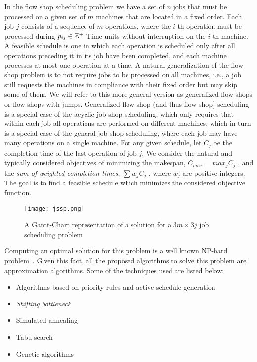 \begin{definition}
In the flow shop scheduling problem we have a set of $n$ jobs that must be
processed on a given set of $m$ machines that are located in a fixed order. Each
job $j$ consists of a sequence of $m$ operations, where the $i$-th operation
must be processed during $p_{ij} \in \mathbb{Z}^{+}$ Time units without interruption on
the $i$-th machine. A feasible schedule is one in which each operation is
scheduled only after all operations preceding it in its job have been completed,
and each machine processes at most one operation at a time. A natural
generalization of the flow shop problem is to not require jobs to be processed
on all machines, i.e., a job still requests the machines in compliance with
their fixed order but may skip some of them. We will refer to this more general
version as generalized flow shops or flow shops with jumps. Generalized flow
shop (and thus flow shop) scheduling is a special case of the acyclic job shop
scheduling, which only requires that within each job all operations are
performed on different machines, which in turn is a special case of the general
job shop scheduling, where each job may have many operations on a single
machine. For any given schedule, let $C_j$ be the completion time of the last
operation of job $j$. We consider the natural and typically considered
objectives of minimizing the makespan, $C_{max} = max_j C_j$ , and the
\textit{sum of weighted completion times}, $\sum w_jC_j$ , where $w_j$ are
positive integers. The goal is to find a feasible schedule which minimizes the
considered objective function.
\end{definition}

\begin{figure}
\begin{center}
\texttt{[image: jssp.png]}
\caption{ A Gantt-Chart representation of a solution for a $3m \times 3j$ job scheduling problem~\cite{geneticbook}}
\label{fig:jssp}
\end{center}
\end{figure}

Computing an optimal solution for this problem is a well known NP-hard
problem~\cite{nphard}. Given this fact, all the proposed algorithms to solve this
problem are approximation algorithms. Some of the techniques used are listed
below:

\begin{itemize}
\item Algorithms based on priority rules and active schedule generation
\item \textit{Shifting bottleneck}
\item Simulated annealing
\item Tabu search
\item Genetic algorithms
\end{itemize}

